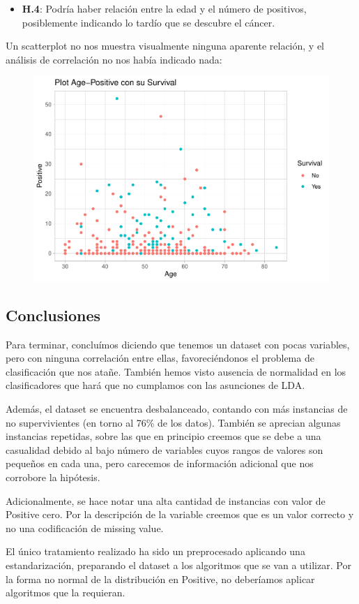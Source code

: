 \newpage

\begin{itemize}
\item \textbf{H.4}: Podría haber relación entre la edad y el número de positivos,
posiblemente indicando lo tardío que se descubre el cáncer.
\end{itemize}

Un scatterplot no nos muestra visualmente ninguna aparente relación, y el análisis de correlación no nos había indicado nada:

\begin{figure}[H]\includegraphics[width=.9\linewidth]{img/EDA2_files/figure-latex/unnamed-chunk-37-1} \end{figure}

\subsection{Conclusiones}

Para terminar, concluímos diciendo que tenemos un dataset con pocas variables, pero con ninguna correlación entre ellas, favoreciéndonos el problema de clasificación que nos atañe. 
También hemos visto ausencia de normalidad en los clasificadores que hará que no cumplamos con las asunciones de LDA.

\vspace{\baselineskip}

Además, el dataset se encuentra desbalanceado, contando con más instancias de no supervivientes (en torno al 76\% de los datos). También se aprecian algunas instancias repetidas, sobre las que en principio creemos que se debe a una casualidad debido al bajo número de variables cuyos rangos de valores son pequeños en cada una, pero carecemos de información adicional que nos corrobore la hipótesis.

Adicionalmente, se hace notar una alta cantidad de instancias con valor de Positive cero. Por la descripción de la variable creemos que es un valor correcto y no una codificación de missing value.

\vspace{\baselineskip}

El único tratamiento realizado ha sido un preprocesado aplicando una estandarización, preparando el dataset a los algoritmos que se van a utilizar. Por la forma no normal de la distribución en Positive, no deberíamos aplicar algoritmos que la requieran.